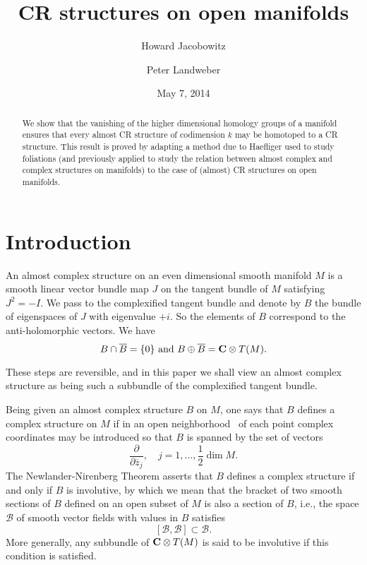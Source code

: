 \documentclass{amsart}
\begin{document}
 

\title{CR structures on open manifolds}

\author {Howard Jacobowitz}
\address {Department of Mathematical Sciences, Rutgers University, Camden, New Jersey, USA}

\author {Peter Landweber}
\address{Department of Mathematics, Rutgers University, Piscataway, NJ 08854, USA}


\date{May 7, 2014}
\begin{abstract}
We show that the vanishing of the higher dimensional homology groups of a manifold ensures that every almost CR structure of codimension $k$ may be homotoped to a CR structure.  This result is proved by adapting a method due to Haefliger used to study foliations (and previously applied to study the relation between almost complex and complex structures on manifolds) to the case of (almost) CR structures on open manifolds.

 
 

\end{abstract}
\maketitle

\def\T10{T^{1,0}C^N}

\medskip
\section{Introduction}
An almost complex structure on an even dimensional smooth manifold $M$
is a smooth linear vector bundle map $J$ on the tangent bundle of $M$
satisfying $J^2 = -I$. We pass to the complexified tangent bundle and
denote by $B$ the bundle of eigenspaces of $J$  with eigenvalue $+i$.  
So the elements of $B$
correspond to the anti-holomorphic vectors.  We have
\[
B \cap \overline  B = \{0\} \mbox{  and  }
B \oplus \overline B = {{\bf{C}}\otimes T(M)} .
\]
  

These steps are reversible, and in this paper we shall view an almost complex structure as being such a subbundle of the complexified tangent bundle.   

Being given an almost complex structure $B$ on $M$, one says that $B$ defines a complex structure on $M$ if in an open {neighborhood\ } of each point complex coordinates may be introduced
so that $B$ is spanned by the set of vectors
\[
\frac \partial {\partial\overline{z}_j},\quad j=1,\ldots , \frac 1 2 \dim M.
\]
The Newlander-Nirenberg Theorem \cite{NN} asserts that $B$ defines a
complex structure if and only if $B$ is involutive, by which we mean
that the bracket of two smooth sections of $B$ defined on an open
subset of $M$ is also a section of $B$, i.e., the space ${{\mathcal B}}$ of 
smooth vector fields with values in $B$ satisfies 
\[
[{{\mathcal B}}, {{\mathcal B}}] \subset {{\mathcal B}}.
\]
More generally, any subbundle of ${{\bf{C}}\otimes T(M)}$ is said to be involutive if
this condition is satisfied.
\end{document}

